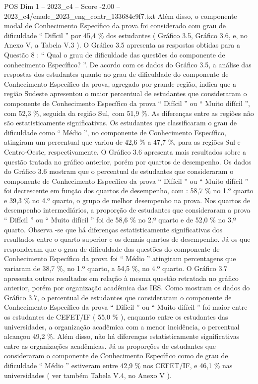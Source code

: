 \begin{textsample}{POS Dim 1 – 2023\_c4 – Score -2.00 – 2023\_c4/enade\_2023\_eng\_contr\_133684c9f7.txt}
Além disso, o componente modal de Conhecimento Específico da prova foi considerado com grau de dificuldade “ Difícil ” por 45,4 \% dos estudantes ( Gráfico 3.5, Gráfico 3.6, e, no Anexo V, a Tabela V.3 ).
O Gráfico 3.5 apresenta as respostas obtidas para a Questão 8 : “ Qual o grau de dificuldade das questões do componente de conhecimento Específico? ”.
De acordo com os dados do Gráfico 3.5, a análise das respostas dos estudantes quanto ao grau de dificuldade do componente de Conhecimento Específico da prova, agregado por grande região, indica que a região Sudeste apresentou o maior percentual de estudantes que consideraram o componente de Conhecimento Específico da prova “ Difícil ” ou “ Muito difícil ”, com 52,3 \%, seguida da região Sul, com 51,9 \%.
As diferenças entre as regiões não são estatisticamente significativas.
Os estudantes que classificaram o grau de dificuldade como “ Médio ”, no componente de Conhecimento Específico, atingiram um percentual que variou de 42,6 \% a 47,7 \%, para as regiões Sul e Centro-Oeste, respectivamente.
O Gráfico 3.6 apresenta mais resultados sobre a questão tratada no gráfico anterior, porém por quartos de desempenho.
Os dados do Gráfico 3.6 mostram que o percentual de estudantes que consideraram o componente de Conhecimento Específico da prova “ Difícil ” ou “ Muito difícil ” foi decrescente em função dos quartos de desempenho, com : 58,7 \% no 1.º quarto e 39,3 \% no 4.º quarto, o grupo de melhor desempenho na prova.
Nos quartos de desempenho intermediários, a proporção de estudantes que consideraram a prova “ Difícil ” ou “ Muito difícil ” foi de 58,6 \% no 2.º quarto e de 52,0 \% no 3.º quarto.
Observa -se que há diferenças estatisticamente significativas dos resultados entre o quarto superior e os demais quartos de desempenho.
Já os que responderam que o grau de dificuldade das questões do componente de Conhecimento Específico da prova foi “ Médio ” atingiram percentagens que variaram de 38,7 \%, no 1.º quarto, a 54,5 \%, no 4.º quarto.
O Gráfico 3.7 apresenta outros resultados em relação à mesma questão retratada no gráfico anterior, porém por organização acadêmica das IES.
Como mostram os dados do Gráfico 3.7, o percentual de estudantes que consideraram o componente de Conhecimento Específico da prova “ Difícil ” ou “ Muito difícil ” foi maior entre os estudantes de CEFET/IF ( 55,0 \% ), enquanto entre os estudantes das universidades, a organização acadêmica com a menor incidência, o percentual alcançou 49,2 \%.
Além disso, não há diferenças estatisticamente significativas entre as organizações acadêmicas.
Já as proporções de estudantes que consideraram o componente de Conhecimento Específico como de grau de dificuldade “ Médio ” estiveram entre 42,9 \% nos CEFET/IF, e 46,1 \% nas universidades ( ver também Tabela V.4, no Anexo V ).

\end{textsample}
